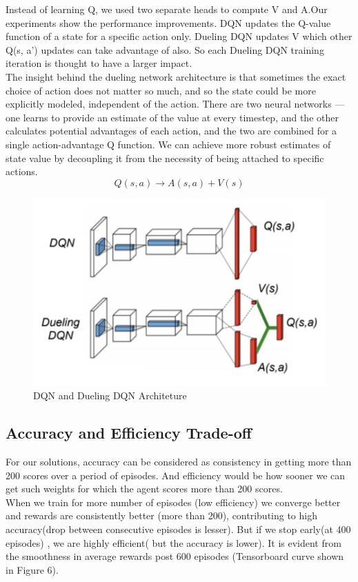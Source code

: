 Instead of learning Q, we used two separate heads to compute V and A.Our experiments show the performance improvements. DQN updates the Q-value function of a state for a specific action only. Dueling DQN updates V which other Q(s, a’) updates can take advantage of also. So each Dueling DQN training iteration is thought to have a larger impact.
\\
The insight behind the dueling network architecture is that sometimes the exact choice of action does not matter so much, and so the state could be more explicitly modeled, independent of the action. There are two neural networks — one learns to provide an estimate of the value at every timestep, and the other calculates potential advantages of each action, and the two are combined for a single action-advantage Q function. We can achieve more robust estimates of state value by decoupling it from the necessity of being attached to specific actions.\citep{Dueling}
\newline
\begin{equation}
Q(s,a) \rightarrow A(s,a) + V(s)
\end{equation}
\newline 

\begin{figure}[!ht]
\includegraphics[scale=0.50,width=0.50\columnwidth]{figures/DuelingArch.png}%
\caption{ DQN and Dueling DQN Architeture\citep{Dueling_Diagram}}%
\label{fig:Dueling and DQN Architecture}%
\end{figure}

\subsection{Accuracy and Efficiency Trade-off}

For our solutions, accuracy can be considered as consistency in getting more than 200 scores over a period of episodes. And efficiency would be how sooner we can get such weights for which the agent scores more than 200 scores. \\

When we train for more number of episodes (low efficiency) we converge better and rewards are consistently better (more than 200), contributing to high accuracy(drop between consecutive episodes is lesser). But if we stop early(at 400 episodes) , we are highly efficient( but the accuracy is lower). It is evident from the smoothness in average rewards post 600 episodes (Tensorboard curve shown in Figure 6).


